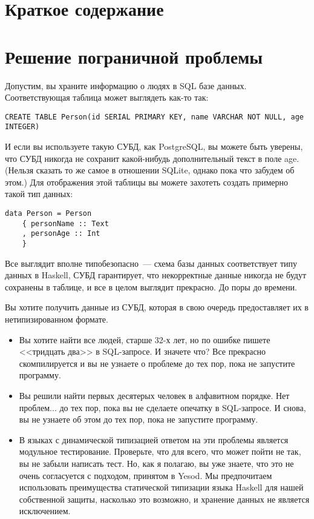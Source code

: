 \section{Краткое содержание} %


\section{Решение пограничной проблемы} %

Допустим, вы храните информацию о людях в SQL базе данных. Соответствующая таблица может выглядеть как-то так:

\begin{lstlisting}
CREATE TABLE Person(id SERIAL PRIMARY KEY, name VARCHAR NOT NULL, age INTEGER)
\end{lstlisting}

И если вы используете такую СУБД, как PostgreSQL, вы можете быть уверены, что СУБД никогда не сохранит какой-нибудь дополнительный текст в поле age. (Нельзя сказать то же самое в отношении SQLite, однако пока что забудем об этом.) Для отображения этой таблицы вы можете захотеть создать примерно такой тип данных:

\begin{lstlisting}
data Person = Person
    { personName :: Text
    , personAge :: Int
    }
\end{lstlisting}

Все выглядит вполне типобезопасно~--- схема базы данных соответствует типу данных в Haskell, СУБД гарантирует, что некорректные данные никогда не будут сохранены в таблице, и все в целом выглядит прекрасно. До поры до времени.

Вы хотите получить данные из СУБД, которая в свою очередь предоставляет их в нетипизированном формате.

\begin{itemize}
  \item Вы хотите найти все людей, старше 32-х лет, но по ошибке пишете <<тридцать два>> в SQL-запросе. И значете что? Все прекрасно скомпилируется и вы не узнаете о проблеме до тех пор, пока не запустите программу.
  \item Вы решили найти первых десятерых человек в алфавитном порядке. Нет проблем... до тех пор, пока вы не сделаете опечатку в SQL-запросе. И снова, вы не узнаете об этом до тех пор, пока не запустите программу.
  \item В языках с динамической типизацией ответом на эти проблемы является модульное тестирование. Проверьте, что для всего, что может пойти не так, вы не забыли написать тест. Но, как я полагаю, вы уже знаете, что это не очень согласуется с подходом, принятом в Yesod. Мы предпочитаем использовать преимущества статической типизации языка Haskell для нашей собственной защиты, насколько это возможно, и хранение данных не является исключением.
\end{itemize}

